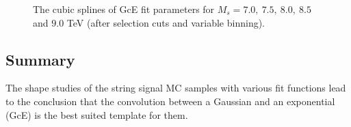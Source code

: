 \begin{figure}[!htb]
  \centering
  \caption{The cubic splines of GcE fit parameters for $M_{s} = 7.0,~7.5,~8.0,~8.5$ and $9.0$ TeV (after selection cuts and variable binning).}
  \label{fig:ReceGcEParam}
\end{figure}



\subsection{Summary}
\label{subsec:StrMorphShapeStudies:Summary}
The shape studies of the string signal MC samples with various fit functions lead to the conclusion that the convolution between a Gaussian and an exponential (GcE) is the best suited template for them. 


